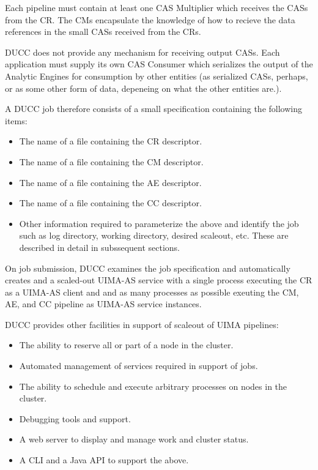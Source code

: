     Each pipeline must contain at least one CAS Multiplier which receives the CASs from the
    CR.  The CMs encapsulate the knowledge of how to recieve the data references in the small
    CASs received from the CRs.  

    DUCC does not provide any mechanism for receiving output CASs.  Each application must
    supply its own CAS Consumer which serializes the output of the Analytic Engines for 
    consumption by other entities (as serialized CASs, perhaps, or as some other form of
    data, depeneing on what the other entities are.).

    A DUCC job therefore consists of a small specification containing the following items:
    
    \begin{itemize}
      \item The name of a file containing the CR descriptor.
      \item The name of a file containing the CM descriptor.
      \item The name of a file containing the AE descriptor.
      \item The name of a file containing the CC descriptor.
      \item Other information required to parameterize the above and identify the job
        such as log directory, working directory, desired scaleout, etc.  These are
        described in detail in subssequent sections.
    \end{itemize}

    On job submission, DUCC examines the job specification and automatically creates and
    a scaled-out UIMA-AS service with a single process executing the CR as a UIMA-AS
    client and and as many processes as possible exeuting the CM, AE, and CC pipeline 
    as UIMA-AS service instances.

    DUCC provides other facilities in support of scaleout of UIMA pipelines:
    \begin{itemize}
      \item The ability to reserve all or part of a node in the cluster.
      \item Automated management of services required in support of jobs.
      \item The ability to schedule and execute arbitrary processes on nodes in the
        cluster.
      \item Debugging tools and support.
      \item A web server to display and manage work and cluster status.
      \item A CLI and a Java API to support the above.
    \end{itemize}
    
